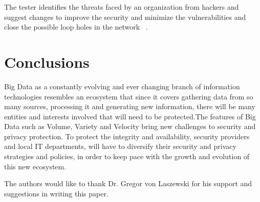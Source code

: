 \documentclass[sigconf]{acmart}
\begin{document}
The  tester identifies the threats faced by an organization from hackers and suggest changes to improve the security and minimize the vulnerabilities and close the possible loop holes in the network ~\cite{shivayogimathoverview}.


\section{Conclusions}

Big Data as a constantly evolving and ever changing branch of information technologies resembles an ecosystem that since it covers gathering data from so many sources, processing it and generating new information, there will be many entities and interests involved that will need to be protected.The features of Big Data such as Volume, Variety and Velocity bring new challenges to security and privacy protection. To protect the integrity and availability, security providers and local IT departments, will have to diversify their security and privacy strategies and policies, in order to keep pace with the growth and evolution of this new ecosystem.

\begin{acks}
The authors would like to thank Dr. Gregor von Laszewski for his support and suggestions in writing this paper.
\end{acks}




\begin{comment}
\newpage

\appendix

\section{Work Breakdown}

\begin{description}

\item[Research for Section Big Data Needs Big Security, Big Data Security and Challenges:] Uma Kugan.

\item[Research for Section Best practices and Future:] Andres Castro Benavides.

\item[Editing:] Andres Castro Benavides and Uma Kugan.

\end{description}
\end{comment}
\end{document}
